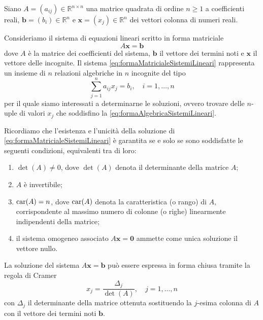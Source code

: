 \nocite{Quarteroni2000}
\nocite{Quarteroni1997}
Siano $A=(a_{ij})\in\mathbb{R}^{n\times n}$ una matrice quadrata di ordine $n\ge1$ a coefficienti reali, $\bm{b}=(b_{i})\in\mathbb{R}^{n}$ 
e $\bm{x}=(x_{j})\in\mathbb{R}^{n}$ dei vettori colonna di numeri reali.

Consideriamo il sistema di equazioni lineari scritto in forma matriciale
\begin{equation}
\label{eq:formaMatricialeSistemiLineari}
A\bm{x}=\bm{b}
\end{equation}
dove $A$ \`e la matrice dei coefficienti del sistema, $\bm{b}$ il vettore dei termini noti e $\bm{x}$ il vettore delle incognite.\newline
Il sistema \eqref{eq:formaMatricialeSistemiLineari} rappresenta un insieme di $n$ relazioni algebriche in 
$n$ incognite del tipo
\begin{equation}
\label{eq:formaAlgebricaSistemiLineari}
\sum_{j=1}^{n}a_{ij}x_{j}=b_{i},\quad i = 1, \dots, n
\end{equation}
per il quale siamo interessati a determinarne le soluzioni, ovvero trovare delle $n$-uple di valori $x_{j}$ che 
soddisfino la \eqref{eq:formaAlgebricaSistemiLineari}.

Ricordiamo che l'esistenza e l'unicit\`a della soluzione di \eqref{eq:formaMatricialeSistemiLineari} \`e garantita se e solo se sono soddisfatte 
le seguenti condizioni, equivalenti tra di loro:
\begin{enumerate}
    \item $\det(A)\ne 0$, dove $\det(A)$ denota il determinante della matrice $A$;
    \item $A$ \`e invertibile;
    \item $\operatorname{car}(A)= n$, dove $\operatorname{car}(A)$ denota la caratteristica (o rango) di $A$, corrispondente al massimo numero di colonne (o righe) linearmente indipendenti della matrice;
    \item il sistema omogeneo associato $A\bm{x}=\bm{0}$ ammette come unica soluzione il vettore nullo.
\end{enumerate}

La soluzione del sistema $A\bm{x}=\bm{b}$ pu\`o essere espressa in forma chiusa tramite la regola di Cramer
\begin{equation}
    x_{j} = \frac{\Delta_{j}}{\det(A)},\quad j = 1, \dots, n
\end{equation}
con $\Delta_{j}$ il determinante della matrice ottenuta sostituendo la $j$-esima colonna di $A$ con il vettore dei termini noti $\bm{b}$.

